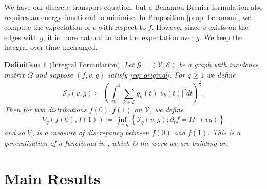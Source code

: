 \documentclass[conference]{IEEEtran}
\newcommand{\GG}{\mathcal{G}}
\newcommand{\VV}{\mathcal{V}}
\newcommand{\EE}{\mathcal{E}}
\theoremstyle{ieeestyle}
\newtheorem{defn}{Definition}
\begin{document}
We have our discrete transport equation, but a Benamou-Brenier formulation also requires an energy functional to minimise. In Proposition \ref{prop: benamou}, we compute the expectation of $v$ with respect to $f$. However since $v$ exists on the edges with $g$, it is more natural to take the expectation over $g$. We keep the integral over time unchanged.
\begin{defn}[Integral Formulation]
    Let $\GG = (\VV,\EE)$ be a graph with incidence matrix $\Omega$ and suppose $(f,v,g)$ satisfy \eqref{eq: original}. For $q \geq 1$ we define
    \begin{equation}\label{eq: I}
        \mathcal{I}_q(v,g) \coloneqq \left(\int_0^1 \sum_{k \in \EE} g_k(t) |v_k(t)|^q dt\right)^{\frac{1}{q}}.
    \end{equation}
    Then for two distributions $f(0),f(1)$ on $\VV$, we define 
    \begin{equation}\label{eq: vg}
        V_q(f(0),f(1)) \coloneqq \inf_{f,v,g} \left\{ \mathcal{I}_q(v,g)  : \partial_t f = \Omega \cdot (vg) \right\}
    \end{equation}
    and so $V_q$ is a measure of discrepancy between $f(0)$ and $f(1)$. This is a generalisation of a functional in \cite[Definition 3.2]{hillion2016}, which is the work we are building on.
\end{defn}
\section{Main Results}
\end{document}

